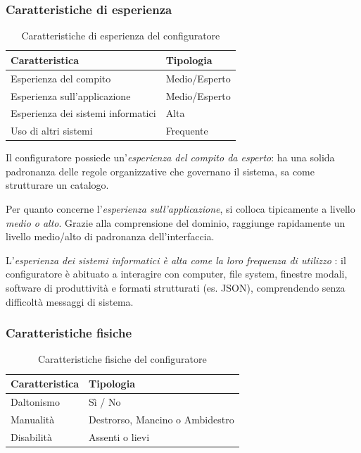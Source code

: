 \subsubsection{Caratteristiche di esperienza}
\begin{table}[H]
    \centering
    \begin{tabular}{@{}>{\raggedright\arraybackslash}p{8cm}>{\raggedright\arraybackslash}p{4cm}@{}}
        \toprule
        \textbf{Caratteristica}            & \textbf{Tipologia} \\ \midrule
        Esperienza del compito             & Medio/Esperto      \\
        Esperienza sull'applicazione       & Medio/Esperto      \\
        Esperienza dei sistemi informatici & Alta               \\
        Uso di altri sistemi               & Frequente          \\ \bottomrule
    \end{tabular}
    \caption{Caratteristiche di esperienza del configuratore}
\end{table}

Il configuratore possiede un'\emph{esperienza del compito da esperto}: ha una solida padronanza delle regole organizzative che governano il sistema, sa come strutturare un catalogo.

Per quanto concerne l'\emph{esperienza sull'applicazione}, si colloca tipicamente a livello \emph{medio o alto}. Grazie alla comprensione del dominio, raggiunge rapidamente un livello medio/alto di padronanza dell'interfaccia.

L'\emph{esperienza dei sistemi informatici è alta come la loro frequenza di utilizzo} : il configuratore è abituato a interagire con computer, file system, finestre modali, software di produttività e formati strutturati (es. JSON), comprendendo senza difficoltà messaggi di sistema.

\subsubsection{Caratteristiche fisiche}
\begin{table}[H]
    \centering
    \begin{tabular}{@{}>{\raggedright\arraybackslash}p{4cm}>{\raggedright\arraybackslash}p{8cm}@{}}
        \toprule
        \textbf{Caratteristica} & \textbf{Tipologia}              \\ \midrule
        Daltonismo              & Sì / No                         \\
        Manualità               & Destrorso, Mancino o Ambidestro \\
        Disabilità              & Assenti o lievi                 \\ \bottomrule
    \end{tabular}
    \caption{Caratteristiche fisiche del configuratore}
\end{table}

